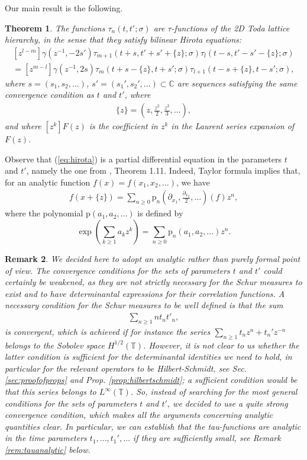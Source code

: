 \documentclass[12pt]{amsart}
\newtheorem{thm}{Theorem}[section]
\newtheorem{rem}[thm]{Remark}
\theoremstyle{definition}
\newcommand{\C}{\mathbb{C}}
\newcommand{\T}{\mathbb{T}}
\begin{document}
Our main result is the following.
\begin{thm} \label{thm:thm1} The functions $\tau_n(t,t';\sigma)$ are $\tau$-functions of the 2D Toda lattice hierarchy, in the sense that they satisfy bilinear Hirota equations:
\begin{multline} \label{eq:hirota}
[z^{l-m}]\gamma(z^{-1},-2s')\tau_{m+1}(t+s,t'+s'+\{z\};\sigma) \tau_l(t-s,t'-s'-\{z\} ; \sigma ) \\
=[z^{m-l}] \gamma(z^{-1},2s) \tau_m (t+s -\{z\} , t +s' ; \sigma) \tau_{l+1}(t-s+ \{z \}, t-s'; \sigma ),
\end{multline}
where $s=(s_1,s_2,\dots)$, $s'=(s_1' , s_2' , \dots ) \subset \C$ are sequences satisfying the same convergence condition as $t$ and $t'$, where
\begin{align*}
\{z\} = \left( z, \frac{z^2}{2}, \frac{z^3}{3}, \dots \right),
\end{align*}
and where $[z^k] F(z)$ is the coefficient in $z^k$ in the Laurent series expansion of $F(z)$.
\end{thm}
Observe that (\ref{eq:hirota}) is a partial differential equation in the parameters $t$ and $t'$, namely the one from \cite{uenotakasaki}, Theorem 1.11. Indeed, Taylor formula implies that, for an analytic function $f(x)=f(x_1,x_2,\dots)$, we have
\begin{align*}
f(x+ \{z\}) = \sum_{ n \geq 0} \mathrm{p}_n \left( \partial_{x_1} , \frac{\partial_{x_2}}{2}, \dots \right) (f) z^n,
\end{align*}
where the polynomial $\mathrm{p}(a_1,a_2,\dots)$ is defined by
\[\exp \left( \sum_{k \geq 1} a_k z^k \right) = \sum_{n \geq 0} \mathrm{p}_n(a_1,a_2,\dots) z^n. \]

\begin{rem}We decided here to adopt an analytic rather than purely formal point of view. The convergence conditions for the sets of parameters $t$ and $t'$ could certainly be weakened, as they are not strictly necessary for the Schur measures to exist and to have determinantal expressions for their correlation functions. A necessary condition for the Schur measures to be well defined is that the sum
\begin{align*}
    \sum_{n \geq 1} nt_n t'_n,
\end{align*}
is convergent, which is achieved if for instance the series $\sum_{n \geq 1}t_nz^n + t_n'z^{-n}$ belongs to the Sobolev space $H^{1/2}(\T)$. However, it is not clear to us whether the latter condition is sufficient for the determinantal identities we need to hold, in particular for the relevant operators to be Hilbert-Schmidt, see Sec. \ref{sec:proofofprops} and Prop. \ref{prop:hilbertschmidt}; a sufficient condition would be that this series belongs to $L^\infty(\T)$. So, instead of searching for the most general conditions for the sets of parameters $t$ and $t'$, we decided to use a quite strong convergence condition, which makes all the arguments concerning analytic quantities clear. In particular, we can establish that the tau-functions are analytic in the time parameters $t_1,\dots,t_1',\dots$ if they are sufficiently small, see Remark \ref{rem:tauanalytic} below.
\end{rem}
\end{document}
